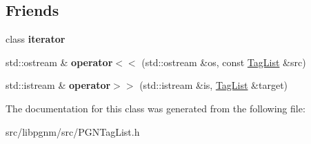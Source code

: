 \subsection*{Friends}
\begin{DoxyCompactItemize}
\item 
\hypertarget{classpgn_1_1TagList_a67171474c4da6cc8efe0c7fafefd2b2d}{
class {\bfseries iterator}}
\label{classpgn_1_1TagList_a67171474c4da6cc8efe0c7fafefd2b2d}

\item 
\hypertarget{classpgn_1_1TagList_a7859171d737456b05e78728ed1c85433}{
std::ostream \& {\bfseries operator$<$$<$} (std::ostream \&os, const \hyperlink{classpgn_1_1TagList}{TagList} \&src)}
\label{classpgn_1_1TagList_a7859171d737456b05e78728ed1c85433}

\item 
\hypertarget{classpgn_1_1TagList_a69f0bae1bceedba0f08ca4a3e524801a}{
std::istream \& {\bfseries operator$>$$>$} (std::istream \&is, \hyperlink{classpgn_1_1TagList}{TagList} \&target)}
\label{classpgn_1_1TagList_a69f0bae1bceedba0f08ca4a3e524801a}

\end{DoxyCompactItemize}


The documentation for this class was generated from the following file:\begin{DoxyCompactItemize}
\item 
src/libpgnm/src/PGNTagList.h\end{DoxyCompactItemize}
